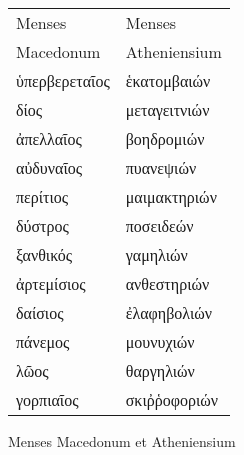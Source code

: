 %
\normalsize
\centering
\begin{tabular}{ l  l }
Menses                    & Menses\\
Macedonum                 & Atheniensium \\
\hline
\textgreek{ὑπερβερεταῖος}  &\textgreek{ἑκατομβαιών} \\
\textgreek{δίος}           &\textgreek{μεταγειτνιών} \\
\textgreek{ἀπελλαῖος}      &\textgreek{βοηδρομιών} \\
%
\textgreek{αὐδυναῖος}      &\textgreek{πυανεψιών} \\
\textgreek{περίτιος}        &\textgreek{μαιμακτηριών} \\
\textgreek{δύστρος}        &\textgreek{ποσειδεών} \\
%
\textgreek{ξανθικός}       &\textgreek{γαμηλιών} \\
\textgreek{ἀρτεμίσιος}     &\textgreek{ανθεστηριών} \\
\textgreek{δαίσιος}        &\textgreek{ἐλαφηβολιών} \\
%
\textgreek{πάνεμος}        &\textgreek{μουνυχιών} \\
\textgreek{λῶος}          &\textgreek{θαργηλιών} \\
\textgreek{γορπιαῖος}      &\textgreek{σκιῤῥοφοριών} \\
\end{tabular}
%
\caption{Menses Macedonum et Atheniensium}
\label{tab:p048}
%
